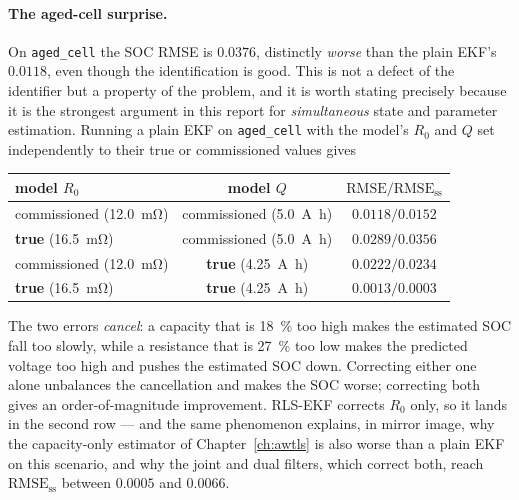 \paragraph{The aged-cell surprise.}  On \texttt{aged\_cell} the SOC RMSE is $0.0376$, distinctly
\emph{worse} than the plain EKF's $0.0118$, even though the identification is good.  This is not a
defect of the identifier but a property of the problem, and it is worth stating precisely because it
is the strongest argument in this report for \emph{simultaneous} state and parameter estimation.
Running a plain EKF on \texttt{aged\_cell} with the model's $R_0$ and $Q$ set independently to their
true or commissioned values gives
\begin{center}
\begin{tabular}{@{}lcc@{}}
\toprule
model $R_0$ & model $Q$ & $\text{RMSE}/\text{RMSE}_\text{ss}$\\
\midrule
commissioned (\SI{12.0}{\milli\ohm}) & commissioned (\SI{5.0}{\ampere\hour}) & $0.0118/0.0152$\\
\textbf{true} (\SI{16.5}{\milli\ohm})& commissioned (\SI{5.0}{\ampere\hour}) & $0.0289/0.0356$\\
commissioned (\SI{12.0}{\milli\ohm}) & \textbf{true} (\SI{4.25}{\ampere\hour})& $0.0222/0.0234$\\
\textbf{true} (\SI{16.5}{\milli\ohm})& \textbf{true} (\SI{4.25}{\ampere\hour})& $0.0013/0.0003$\\
\bottomrule
\end{tabular}
\end{center}
The two errors \emph{cancel}: a capacity that is \SI{18}{\percent} too high makes the estimated SOC
fall too slowly, while a resistance that is \SI{27}{\percent} too low makes the predicted voltage too
high and pushes the estimated SOC down.  Correcting either one alone unbalances the cancellation and
makes the SOC worse; correcting both gives an order-of-magnitude improvement.  RLS-EKF corrects
$R_0$ only, so it lands in the second row --- and the same phenomenon explains, in mirror image, why
the capacity-only estimator of Chapter~\ref{ch:awtls} is also worse than a plain EKF on this
scenario, and why the joint and dual filters, which correct both, reach $\text{RMSE}_\text{ss}$
between $0.0005$ and $0.0066$.


